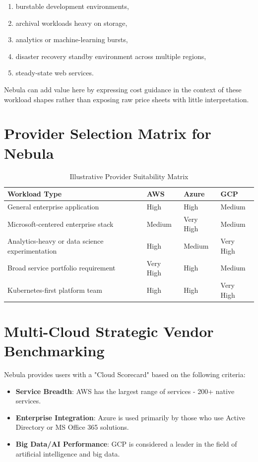 \begin{enumerate}
    \item burstable development environments,
    \item archival workloads heavy on storage,
    \item analytics or machine-learning bursts,
    \item disaster recovery standby environment across multiple regions,
    \item steady-state web services.
\end{enumerate}


Nebula can add value here by expressing cost guidance in the context of these workload shapes rather than exposing raw price sheets with little interpretation.

\section{Provider Selection Matrix for Nebula}
\begin{table}
\centering
\caption{Illustrative Provider Suitability Matrix}
\label{tab:provider_suitability}
\begin{tabular}{|p{4.4cm}|p{2.0cm}|p{2.0cm}|p{2.0cm}|}
\hline
\textbf{Workload Type} & \textbf{AWS} & \textbf{Azure} & \textbf{GCP} \\ \hline
General enterprise application & High & High & Medium \\ \hline
Microsoft-centered enterprise stack & Medium & Very High & Medium \\ \hline
Analytics-heavy or data science experimentation & High & Medium & Very High \\ \hline
Broad service portfolio requirement & Very High & High & Medium \\ \hline
Kubernetes-first platform team & High & High & Very High \\ \hline
\end{tabular}
\end{table}

\section{Multi-Cloud Strategic Vendor Benchmarking}
Nebula provides users with a "Cloud Scorecard" based on the following criteria:

\begin{itemize}
    \item \textbf{Service Breadth}: AWS has the largest range of services - 200+ native services.
    \item \textbf{Enterprise Integration}: Azure is used primarily by those who use Active Directory or MS Office 365 solutions.
    \item \textbf{Big Data/AI Performance}: GCP is considered a leader in the field of artificial intelligence and big data.
\end{itemize}


